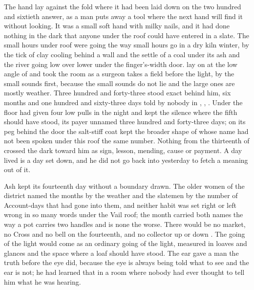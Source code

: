 
The hand lay against the fold where it had been laid down on the two hundred and sixtieth answer, as a man puts away a tool where the next hand will find it without looking. It was a small soft hand with milky nails, and it had done nothing in the dark that anyone under the roof could have entered in a slate. The small hours under  roof were going the way small hours go in a dry kiln winter, by the tick of clay cooling behind a wall and the settle of a coal under its ash and the river going low over lower under the finger's-width door.  lay on  at the low angle of  and took the room as a surgeon takes a field before the light, by the small sounds first, because the small sounds do not lie and the large ones are mostly weather. Three hundred and forty-three stood exact behind him, six months and one hundred and sixty-three days told by nobody in , , . Under the floor  had given four low pulls in the night and kept the silence where the fifth should have stood, its payer unnamed three hundred and forty-three days; on its peg behind the door the salt-stiff coat kept the broader shape of  whose name had not been spoken under this roof the same number. Nothing from the thirteenth of  crossed the dark toward him as sign, lesson, mending, cause or payment. A day lived is a day set down, and he did not go back into yesterday to fetch a meaning out of it.

Ash kept its fourteenth day without a boundary drawn. The older women of the district named the months by the weather and the slatemen by the number of Account-days that had gone into them, and neither habit was set right or left wrong in so many words under the Vail roof; the month carried both names the way a pot carries two handles and is none the worse. There would be no market, no Cross and no bell on the fourteenth, and no collector up or down . The going of the light would come as an ordinary going of the light, measured in loaves and glances and the space where a loaf should have stood. The ear gave a man the truth before the eye did, because the eye is always being told what to see and the ear is not; he had learned that in a room where nobody had ever thought to tell him what he was hearing.

